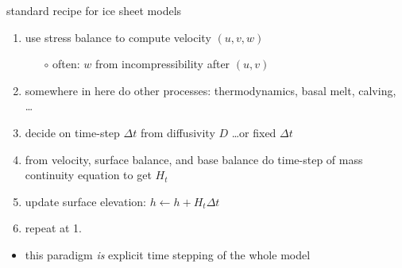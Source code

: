 \begin{frame}{standard recipe for ice sheet models}

\begin{enumerate}
  \item use stress balance to compute velocity $(u,v,w)$
      \begin{itemize}
      \item[$\circ$] often: $w$ from incompressibility after $(u,v)$
      \end{itemize}
  \item somewhere in here do other processes: thermodynamics, basal melt, calving, \dots
  \item decide on time-step $\Delta t$ from diffusivity $D$ \dots or fixed $\Delta t$
  \item from velocity, surface balance, and base balance do time-step of mass continuity equation to get $H_t$
  \item update surface elevation: $h \gets h+H_t \Delta t$
  \item repeat at 1.
\end{enumerate}

\bigskip
\begin{itemize}
\item this paradigm \emph{is} explicit time stepping of the whole model
\end{itemize}
\end{frame}
